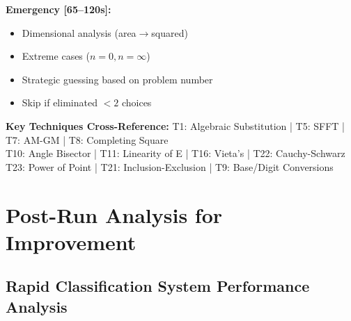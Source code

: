 \documentclass{article}
\begin{document}
\begin{tcolorbox}[colback=green!5!white,colframe=green!75!black,title={\textbf{QUICK REFERENCE: Mental Math by Timeline Phase}}]
\textbf{Emergency [65--120s]:}
\begin{itemize}[nosep]
\item Dimensional analysis (area$\rightarrow$squared)
\item Extreme cases ($n=0, n=\infty$)
\item Strategic guessing based on problem number
\item Skip if eliminated $<2$ choices
\end{itemize}

\textbf{Key Techniques Cross-Reference:}
T1: Algebraic Substitution | T5: SFFT | T7: AM-GM | T8: Completing Square\\
T10: Angle Bisector | T11: Linearity of E | T16: Vieta's | T22: Cauchy-Schwarz\\
T23: Power of Point | T21: Inclusion-Exclusion | T9: Base/Digit Conversions
\end{tcolorbox}

\newpage

\section{Post-Run Analysis for Improvement}

\subsection{Rapid Classification System Performance Analysis}
\end{document}
